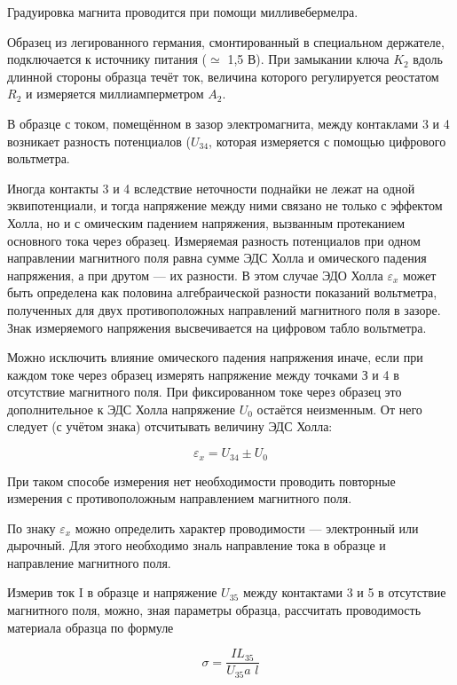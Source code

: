 \documentclass[a4paper,12pt]{article} %
\begin{document}
Градуировка магнита проводится при помощи милливебермелра.

Образец из легированного германия, смонтированный в специальном держателе, подключается к источнику питания ($\simeq$ 1,5 В). При замыкании ключа $K_2$ вдоль длинной стороны образца течёт ток, величина которого регулируется реостатом $R_2$ и измеряется миллиамперметром $A_2$.

В образце с током, помещённом в зазор электромагнита, между контаклами 3 и 4 возникает разность потенциалов ($U_{34}$, которая измеряется с помощью цифрового вольтметра.

Иногда контакты 3 и 4 вследствие неточности поднайки не лежат на одной эквипотенциали, и тогда напряжение между ними связано не только с эффектом Холла, но и с омическим падением напряжения, вызванным протеканием основного тока через образец. Измеряемая разность потенциалов при одном направлении магнитного поля равна сумме ЭДС Холла и омического падения напряжения, а при друтом — их разности. В этом случае ЭДО Холла $\varepsilon_x$ может быть определена как половина алгебраической разности показаний вольтметра, полученных для двух противоположных направлений магнитного поля в зазоре. Знак измеряемого напряжения высвечивается на цифровом табло вольтметра.

Можно исключить влияние омического падения напряжения иначе, если при каждом токе через образец измерять напряжение между точками З и 4 в отсутствие магнитного поля. При фиксированном токе через образец это дополнительное к ЭДС Холла напряжение $U_0$ остаётся неизменным. От него следует (с учётом знака) отсчитывать величину ЭДС Холла:

\begin{equation}\label{eq1}
\varepsilon_x = U_{34} \pm U_0
\end{equation}

При таком способе измерения нет необходимости проводить повторные измерения с противоположным направлением магнитного поля.

По знаку $\varepsilon_x$ можно определить характер проводимости — электронный или дырочный. Для этого необходимо зналь направление тока в образце и направление магнитного поля.

Измерив ток I в образце и напряжение $U_{35}$ между контактами 3 и 5 в отсутствие магнитного поля, можно, зная параметры образца, рассчитать проводимость материала образца по формуле

\begin{equation}\label{eq2}
\sigma = \frac{I L_{35}}{U_{35} \textit{a l}}
\end{equation}
\end{document}
